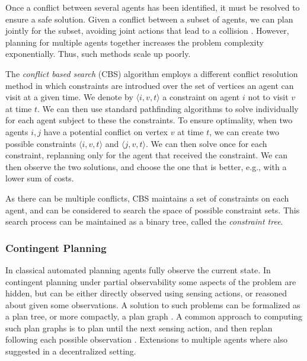 \documentclass[letterpaper]{article} %
\begin{document}
Once a conflict between several agents has been identified, it must be resolved to ensure a safe solution. Given a conflict between a subset of agents, we can plan jointly for the subset, avoiding joint actions that lead to a collision \cite{standley2010finding}. However, planning for multiple agents together increases the problem complexity exponentially. Thus, such methods scale up poorly.

The \emph{conflict based search} (CBS) \cite{sharon2015conflict} algorithm employs a different conflict resolution method in which constraints are introdued over the set of vertices an agent can visit at a given time. We denote by $\langle i,v,t \rangle$ a constraint on agent $i$ not to visit $v$ at time $t$.
We can then use standard pathfinding algorithms to solve individually for each agent subject to these the constraints. To ensure optimality, when two agents $i,j$ have a potential conflict on vertex $v$ at time $t$, we can create two possible constraints $\langle i,v,t \rangle$ and $\langle j,v,t \rangle$. We can then solve once for each constraint, replanning only for the agent that received the constraint. We can then observe the two solutions, and choose the one that is better, e.g., with a lower sum of costs.

As there can be multiple conflicts, CBS maintains a set of constraints on each agent, and can be considered to search the space of possible constraint sets. This search process can be maintained as a binary tree, called the \emph{constraint tree}.



\subsubsection{Contingent Planning}

In classical automated planning agents fully observe the current state. In contingent planning under partial observability \cite{albore2009translation,BrafmanS12,bonet2011planning} some aspects of the problem are hidden, but can be either directly observed using sensing actions, or reasoned about given some observations.
A solution to such problems can be formalized as a plan tree, or more compactly, a plan graph \cite{muise2014computing,MaliahKS21}.
A common approach to computing such plan graphs is to plan until the next sensing action, and then replan following each possible observation \cite{bonet2011planning,MaliahKS21}. Extensions to multiple agents where also suggested \cite{brafman2013qualitative,bazinin2018iterative} in a decentralized setting.
\end{document}

